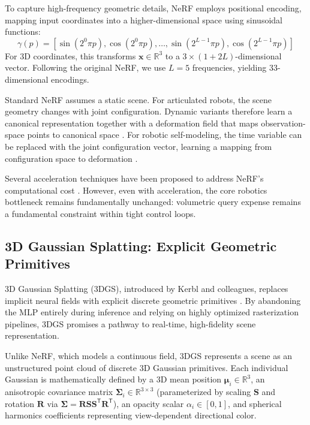 \documentclass[12pt,a4paper,oneside]{report}
\begin{document}
To capture high-frequency geometric details, NeRF employs positional encoding, mapping input coordinates into a higher-dimensional space using sinusoidal functions:
\begin{equation}
\gamma(p) = [\sin(2^0 \pi p), \cos(2^0 \pi p), \ldots, \sin(2^{L-1} \pi p), \cos(2^{L-1} \pi p)]
\end{equation}
For 3D coordinates, this transforms $\mathbf{x} \in \mathbb{R}^3$ to a $3 \times (1 + 2L)$-dimensional vector. Following the original NeRF, we use $L = 5$ frequencies, yielding 33-dimensional encodings.

Standard NeRF assumes a static scene. For articulated robots, the scene geometry changes with joint configuration. Dynamic variants therefore learn a canonical representation together with a deformation field that maps observation-space points to canonical space \cite{pumarola2021d, park2021nerfies}. For robotic self-modeling, the time variable can be replaced with the joint configuration vector, learning a mapping from configuration space to deformation \cite{hu2024teaching}.

Several acceleration techniques have been proposed to address NeRF's computational cost \cite{muller2022instant, barron2021mip, barron2023zipnerf, levy2024simdist}. However, even with acceleration, the core robotics bottleneck remains fundamentally unchanged: volumetric query expense remains a fundamental constraint within tight control loops.

\subsection{3D Gaussian Splatting: Explicit Geometric Primitives}
3D Gaussian Splatting (3DGS), introduced by Kerbl and colleagues, replaces implicit neural fields with explicit discrete geometric primitives \cite{kerbl20233d}. By abandoning the MLP entirely during inference and relying on highly optimized rasterization pipelines, 3DGS promises a pathway to real-time, high-fidelity scene representation.

Unlike NeRF, which models a continuous field, 3DGS represents a scene as an unstructured point cloud of discrete 3D Gaussian primitives. Each individual Gaussian is mathematically defined by a 3D mean position $\boldsymbol{\mu}_i \in \mathbb{R}^3$, an anisotropic covariance matrix $\boldsymbol{\Sigma}_i \in \mathbb{R}^{3 \times 3}$ (parameterized by scaling $\mathbf{S}$ and rotation $\mathbf{R}$ via $\boldsymbol{\Sigma} = \mathbf{R} \mathbf{S} \mathbf{S}^\mathsf{T} \mathbf{R}^\mathsf{T}$), an opacity scalar $\alpha_i \in [0, 1]$, and spherical harmonics coefficients representing view-dependent directional color.
\end{document}
